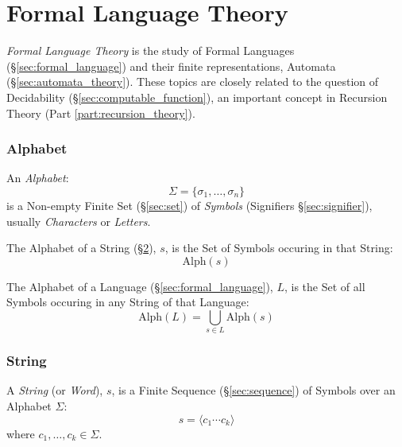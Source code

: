 \part{Formal Language Theory}\label{part:formal_language}
\cite{hammel03}

\emph{Formal Language Theory} is the study of Formal Languages
(\S\ref{sec:formal_language}) and their finite representations,
Automata (\S\ref{sec:automata_theory}). These topics are closely
related to the question of Decidability
(\S\ref{sec:computable_function}), an important concept in Recursion
Theory (Part \ref{part:recursion_theory}).



\section{Alphabet}\label{sec:alphabet}

An \emph{Alphabet}:
\[
  \Sigma = \{ \sigma_1, \ldots, \sigma_n \}
\]
is a Non-empty Finite Set (\S\ref{sec:set}) of \emph{Symbols}
(Signifiers \S\ref{sec:signifier}), usually \emph{Characters} or
\emph{Letters}.

The Alphabet of a String (\S\ref{sec:string}), $s$, is the Set of
Symbols occuring in that String:
\[
  \mathrm{Alph}(s)
\]

The Alphabet of a Language (\S\ref{sec:formal_language}), $L$, is the
Set of all Symbols occuring in any String of that Language:
\[
  \mathrm{Alph}(L) = \bigcup_{s \in L} \mathrm{Alph}(s)
\]



\section{String}\label{sec:string}

A \emph{String} (or \emph{Word}), $s$, is a Finite Sequence
(\S\ref{sec:sequence}) of Symbols over an Alphabet $\Sigma$:
\[
  s = \langle c_1 \cdots c_k \rangle
\]
where $c_1, \ldots, c_k \in \Sigma$.

